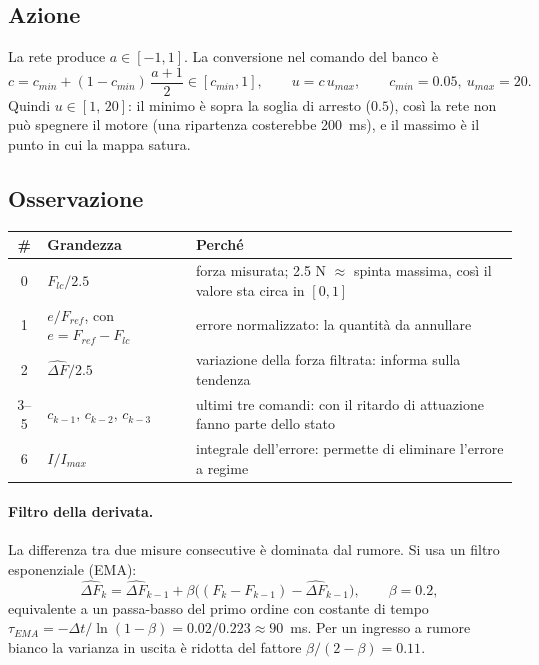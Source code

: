 \documentclass[11pt,a4paper]{article}
\newcommand{\envfile}{../../controller/env_fan.py}
\newcommand{\envlines}[2]{}
\begin{document}
\subsection{Azione}
La rete produce $a\in[-1,1]$. La conversione nel comando del banco è
\begin{equation}
c = c_{min} + (1 - c_{min})\,\frac{a+1}{2}\in[c_{min},1],\qquad u = c\,u_{max},
\qquad c_{min} = 0.05,\ u_{max} = 20 .
\end{equation}
Quindi $u\in[1,\,20]$: il minimo è sopra la soglia di arresto ($0.5$), così la rete non può spegnere
il motore (una ripartenza costerebbe 200~ms), e il massimo è il punto in cui la mappa satura.

\subsection{Osservazione}
\begin{center}
\begin{tabularx}{\textwidth}{@{}clX@{}}
\toprule
\# & Grandezza & Perché\\
\midrule
0 & $F_{lc}/2.5$ & forza misurata; 2.5 N $\approx$ spinta massima, così il valore sta circa in $[0,1]$\\
1 & $e/F_{ref}$, con $e = F_{ref} - F_{lc}$ & errore normalizzato: la quantità da annullare\\
2 & $\widehat{\Delta F}/2.5$ & variazione della forza filtrata: informa sulla tendenza\\
3--5 & $c_{k-1},\,c_{k-2},\,c_{k-3}$ & ultimi tre comandi: con il ritardo di attuazione fanno parte dello stato\\
6 & $I/I_{max}$ & integrale dell'errore: permette di eliminare l'errore a regime\\
\bottomrule
\end{tabularx}
\end{center}
\envlines{219}{232}

\paragraph{Filtro della derivata.} La differenza tra due misure consecutive è dominata dal rumore.
Si usa un filtro esponenziale (EMA):
\begin{equation}
\widehat{\Delta F}_k = \widehat{\Delta F}_{k-1} + \beta\big((F_k - F_{k-1}) - \widehat{\Delta F}_{k-1}\big),\qquad \beta = 0.2,
\end{equation}
equivalente a un passa-basso del primo ordine con costante di tempo
$\tau_{EMA} = -\Delta t/\ln(1-\beta) = 0.02/0.223 \approx 90$~ms.
Per un ingresso a rumore bianco la varianza in uscita è ridotta del fattore $\beta/(2-\beta) = 0.11$.
\end{document}
